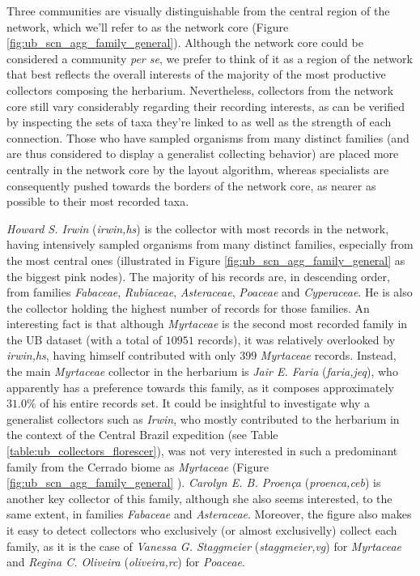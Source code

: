 Three communities are visually distinguishable from the central region of the network, which we'll refer to as the network core (Figure \ref{fig:ub_scn_agg_family_general}).
Although the network core could be considered a community \textit{per se}, we prefer to think of it as a region of the network that best reflects the overall interests of the majority of the most productive collectors composing the herbarium.
Nevertheless, collectors from the network core still vary considerably regarding their recording interests, as can be verified by inspecting the sets of taxa they're linked to as well as the strength of each connection. 
Those who have sampled organisms from many distinct families (and are thus considered to display a generalist collecting behavior) are placed more centrally in the network core by the layout algorithm, whereas specialists are consequently pushed towards the borders of the network core, as nearer as possible to their most recorded taxa.

\textit{Howard S. Irwin} (\textit{irwin,hs}) is the collector with most records in the network, having intensively sampled organisms from many distinct families, especially from the most central ones (illustrated in Figure \ref{fig:ub_scn_agg_family_general} as the biggest pink nodes).
The majority of his records are, in descending order, from families \textit{Fabaceae}, \textit{Rubiaceae}, \textit{Asteraceae}, \textit{Poaceae} and \textit{Cyperaceae}. 
He is also the collector holding the highest number of records for those families.
An interesting fact is that although \textit{Myrtaceae} is the second most recorded family in the UB dataset (with a total of $10951$ records), it was relatively overlooked by \textit{irwin,hs}, having himself contributed with only $399$ \textit{Myrtaceae} records. 
Instead, the main \textit{Myrtaceae} collector in the herbarium is \textit{Jair E. Faria} (\textit{faria,jeq}), who apparently has a preference towards this family, as it composes approximately $31.0\%$ of his entire records set. 
It could be insightful to investigate why a generalist collectors such as \textit{Irwin}, who mostly contributed to the herbarium in the context of the Central Brazil expedition (see Table \ref{table:ub_collectors_florescer}), was not very interested in such a predominant family from the Cerrado biome as \textit{Myrtaceae} (Figure \ref{fig:ub_scn_agg_family_general} ).
\textit{Carolyn E. B. Proença} (\textit{proenca,ceb}) is another key collector of this family, although she also seems interested, to the same extent, in families \textit{Fabaceae} and \textit{Asteraceae}. 
Moreover, the figure also makes it easy to detect collectors who exclusively (or almost exclusivelly) collect each family, as it is the case of \textit{Vanessa G. Staggmeier} (\textit{staggmeier,vg}) for \textit{Myrtaceae} and \textit{Regina C. Oliveira} (\textit{oliveira,rc}) for \textit{Poaceae}.

